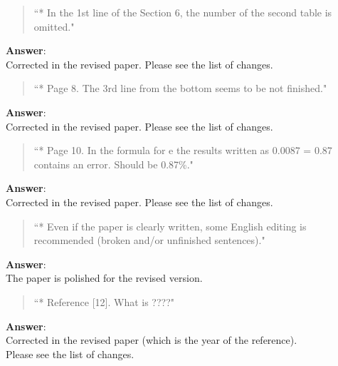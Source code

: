 \documentclass{article}
\begin{document}
\begin{quote}
    ``* In the 1st line of the Section 6, the number of the second table is omitted."
\end{quote}
\textbf{Answer}: \\
Corrected in the revised paper. Please see the list of changes. 

\begin{quote}
    ``* Page 8. The 3rd line from the bottom seems to be not finished."
\end{quote}
\textbf{Answer}: \\
Corrected in the revised paper. Please see the list of changes. 

\begin{quote}
    ``* Page 10. In the formula for e the results written as 0.0087 = 0.87 contains an error. Should be 0.87\%."
\end{quote}
\textbf{Answer}: \\
Corrected in the revised paper. Please see the list of changes. 

\begin{quote}
    ``* Even if the paper is clearly written, some English editing is recommended (broken and/or unfinished sentences)."
\end{quote}
\textbf{Answer}: \\
The paper is polished for the revised version. 

\begin{quote}
    ``* Reference [12]. What is ????"
\end{quote}
\textbf{Answer}: \\
Corrected in the revised paper (which is the year of the reference). \\
Please see the list of changes. 
\end{document}
